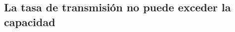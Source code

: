 \documentclass{beamer}
\theoremstyle{plain}
\theoremstyle{example}
\theoremstyle{example}
\begin{document}






\subsection{La tasa de transmisión no puede exceder la capacidad}
\end{document}

